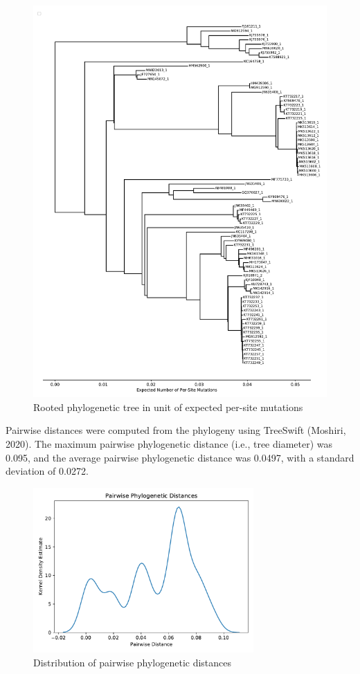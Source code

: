 \documentclass{article}
\begin{document}
\begin{figure}[h]
\centering
\includegraphics[width=1\textwidth,height=1\textheight,keepaspectratio]{./figs/tree_mutations.pdf}
\caption{Rooted phylogenetic tree in unit of expected per-site mutations}
\end{figure}

Pairwise distances were computed from the phylogeny using TreeSwift (Moshiri, 2020). The maximum pairwise phylogenetic distance (i.e., tree diameter) was 0.095, and the average pairwise phylogenetic distance was 0.0497, with a standard deviation of 0.0272.

\begin{figure}[h]
\centering
\includegraphics[width=0.75\textwidth,keepaspectratio]{./figs/pairwise_distances_tree.pdf}
\caption{Distribution of pairwise phylogenetic distances}
\end{figure}
\end{document}
